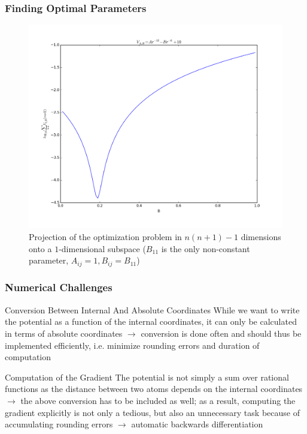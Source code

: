 \documentclass{beamer}
\begin{document}
\begin{frame}
\frametitle{Finding Optimal Parameters}

\begin{figure}
\caption{Projection of the optimization problem in $n(n+1)-1$ dimensions onto a $1$-dimensional subspace ($B_{11}$ is the only non-constant parameter, $A_{ij}=1, B_{ij}=B_{11}$)}
\includegraphics[width=0.75\linewidth]{sumoverU.png}
\end{figure}


\end{frame}


\begin{frame}
\frametitle{Numerical Challenges}
\begin{block}{Conversion Between Internal And Absolute Coordinates}
While we want to write the potential as a function of the internal coordinates, it can only be calculated in terms of absolute coordinates $\rightarrow$ conversion is done often and should thus be implemented efficiently, i.e. minimize rounding errors and duration of computation
\end{block}

\begin{block}{Computation of the Gradient}
The potential is not simply a sum over rational functions as the distance between two atoms depends on the internal coordinates $\rightarrow$ the above conversion has to be included as well; as a result, computing the gradient explicitly is not only a tedious, but also an unnecessary task because of accumulating rounding errors $\rightarrow$ automatic backwards differentiation
\end{block}
\end{frame}
\end{document}
